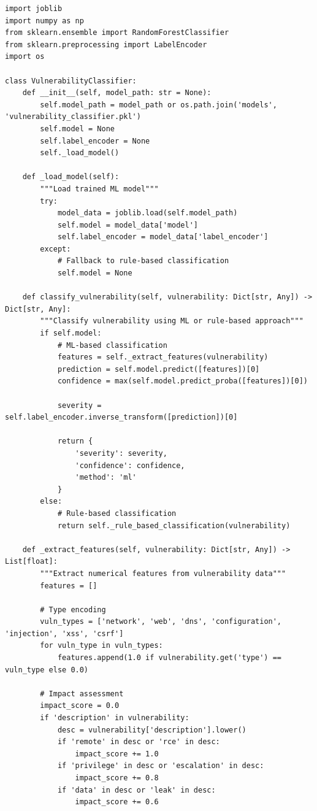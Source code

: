 \documentclass[12pt,a4paper]{report}
\begin{document}
\begin{lstlisting}[caption=AI Engine Implementation]
import joblib
import numpy as np
from sklearn.ensemble import RandomForestClassifier
from sklearn.preprocessing import LabelEncoder
import os

class VulnerabilityClassifier:
    def __init__(self, model_path: str = None):
        self.model_path = model_path or os.path.join('models', 'vulnerability_classifier.pkl')
        self.model = None
        self.label_encoder = None
        self._load_model()
        
    def _load_model(self):
        """Load trained ML model"""
        try:
            model_data = joblib.load(self.model_path)
            self.model = model_data['model']
            self.label_encoder = model_data['label_encoder']
        except:
            # Fallback to rule-based classification
            self.model = None
            
    def classify_vulnerability(self, vulnerability: Dict[str, Any]) -> Dict[str, Any]:
        """Classify vulnerability using ML or rule-based approach"""
        if self.model:
            # ML-based classification
            features = self._extract_features(vulnerability)
            prediction = self.model.predict([features])[0]
            confidence = max(self.model.predict_proba([features])[0])
            
            severity = self.label_encoder.inverse_transform([prediction])[0]
            
            return {
                'severity': severity,
                'confidence': confidence,
                'method': 'ml'
            }
        else:
            # Rule-based classification
            return self._rule_based_classification(vulnerability)
    
    def _extract_features(self, vulnerability: Dict[str, Any]) -> List[float]:
        """Extract numerical features from vulnerability data"""
        features = []
        
        # Type encoding
        vuln_types = ['network', 'web', 'dns', 'configuration', 'injection', 'xss', 'csrf']
        for vuln_type in vuln_types:
            features.append(1.0 if vulnerability.get('type') == vuln_type else 0.0)
        
        # Impact assessment
        impact_score = 0.0
        if 'description' in vulnerability:
            desc = vulnerability['description'].lower()
            if 'remote' in desc or 'rce' in desc:
                impact_score += 1.0
            if 'privilege' in desc or 'escalation' in desc:
                impact_score += 0.8
            if 'data' in desc or 'leak' in desc:
                impact_score += 0.6
                

\end{lstlisting}
\end{document}
